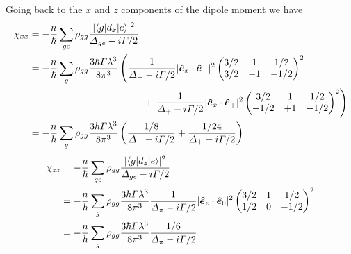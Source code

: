 Going back to the $x$ and $z$ components of the dipole moment we have 
\begin{equation}
\begin{split}
   \chi_{xx}
   & = - \frac{n}{\hbar} \sum_{ge}\rho_{gg} 
   \frac{ |\langle g | d_{x} | e \rangle|^{2} } 
       { \Delta_{ge} - i\Gamma/2 } \\
   & = - \frac{n}{\hbar} \sum_{g} \rho_{gg} 
    \frac{ 3\hbar \Gamma \lambda^{3}}{ 8 \pi^{3}}
       \left( \frac{1}{\Delta_{-} - i \Gamma/2 } 
              |\bm{\hat{e}}_{x}\cdot \bm{\hat{e}}_{-}|^{2} 
              \begin{pmatrix} 3/2 & 1 & 1/2 \\ 3/2 & -1 & -1/2 \end{pmatrix}^{2} \right.  \\
   & \ \ \ \ \ \ \hspace{1.3in}\   +  
       \left. \frac{1}{\Delta_{+} - i \Gamma/2 } 
              |\bm{\hat{e}}_{x}\cdot \bm{\hat{e}}_{+}|^{2} 
              \begin{pmatrix} 3/2 & 1 & 1/2 \\ -1/2 & +1 & -1/2 \end{pmatrix}^{2} 
       \right) \\ 
   & = - \frac{n}{\hbar} \sum_{g} \rho_{gg} 
    \frac{ 3\hbar \Gamma \lambda^{3}}{ 8 \pi^{3}}
       \left( \frac{1/8}{\Delta_{-} - i \Gamma/2 } 
       +  
              \frac{1/24}{\Delta_{+} - i \Gamma/2 }  
       \right)  
\end{split} 
\end{equation}
\begin{equation}
\begin{split}
   \chi_{zz}
   & = - \frac{n}{\hbar} \sum_{ge}\rho_{gg} 
   \frac{ |\langle g | d_{z} | e \rangle|^{2} } 
       { \Delta_{ge} - i\Gamma/2 } \\
   & = - \frac{n}{\hbar} \sum_{g} \rho_{gg} 
    \frac{ 3\hbar \Gamma \lambda^{3}}{ 8 \pi^{3}}
              \frac{1}{\Delta_{\pi} - i \Gamma/2 } 
              |\bm{\hat{e}}_{z}\cdot \bm{\hat{e}}_{0}|^{2} 
              \begin{pmatrix} 3/2 & 1 & 1/2 \\ 1/2 & 0 & -1/2 \end{pmatrix}^{2} \\
   & = - \frac{n}{\hbar} \sum_{g} \rho_{gg} 
    \frac{ 3\hbar \Gamma \lambda^{3}}{ 8 \pi^{3}}
              \frac{1/6}{\Delta_{\pi} - i \Gamma/2 } 
\end{split} 
\end{equation}

